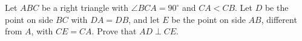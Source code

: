 Let $ABC$ be a right triangle with $\angle BCA=90^\circ$ and $CA<CB$. Let $D$ be the point on side $BC$ with $DA=DB$, and let $E$ be the point on side $AB$, different from $A$, with $CE=CA$. Prove that $AD\perp CE$.
